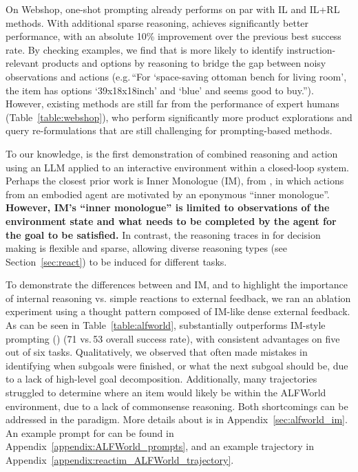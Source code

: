 On Webshop, one-shot \act{} prompting already performs on par with IL and IL+RL methods. With additional sparse reasoning, \model{} achieves significantly better performance, with an absolute 10\% improvement over the  previous best success rate. 
By checking examples, we find that \model{} is more likely to identify instruction-relevant products and options by reasoning to bridge the gap between noisy observations and actions (e.g.\,``For `space-saving ottoman bench for living room', the item has options `39x18x18inch' and `blue' and seems good to buy.'').
However, existing methods are still far from the performance of expert humans (Table~\ref{table:webshop}), who perform significantly more product explorations and query re-formulations that are still challenging for prompting-based methods.


To our knowledge, \model{} is the first demonstration of combined reasoning and action using an LLM applied to an interactive environment within a closed-loop system. Perhaps the closest prior work is Inner Monologue (IM), from \cite{huang2022inner}, in which actions from an embodied agent are motivated by an eponymous ``inner monologue''. \textbf{However, IM's ``inner monologue'' 
is limited to observations of the environment state and what needs to be completed by the agent for the goal to be satisfied.}
In contrast, the reasoning traces in \model{} for decision making is flexible and sparse, allowing diverse reasoning types (see Section~\ref{sec:react}) to be induced for different tasks.

To demonstrate the differences between \model{} and IM, and to highlight the importance of internal reasoning vs. simple reactions to external feedback, we ran an ablation experiment using a thought pattern composed of IM-like dense external feedback. As can be seen in Table~\ref{table:alfworld}, \model{} substantially outperforms IM-style prompting (\modelim{}) (71 vs.\,53 overall success rate), with consistent advantages on five out of six tasks. 
Qualitatively, we observed that \modelim{} often made mistakes in identifying when subgoals were finished, or what the next subgoal should be, due to a lack of high-level goal decomposition. Additionally, many \modelim{} trajectories struggled to determine where an item would likely be within the ALFWorld environment, due to a lack of commonsense reasoning. Both shortcomings can be addressed in the \model{} paradigm. 
More details about \modelim{} is in Appendix~\ref{sec:alfworld_im}. An example prompt for \modelim{} can be found in Appendix~\ref{appendix:ALFWorld_prompts}, and an example trajectory in Appendix~\ref{appendix:reactim_ALFWorld_trajectory}.
